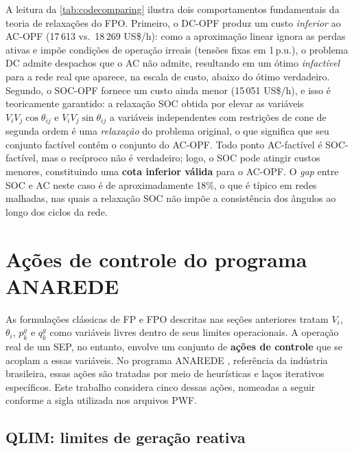 A leitura da \autoref{tab:codecomparing} ilustra dois comportamentos fundamentais da teoria de relaxações do FPO. Primeiro, o DC-OPF produz um custo \emph{inferior} ao AC-OPF (17\,613 vs.\ 18\,269 US\$/h): como a aproximação linear ignora as perdas ativas e impõe condições de operação irreais (tensões fixas em 1\,p.u.), o problema DC admite despachos que o AC não admite, resultando em um ótimo \emph{infactível} para a rede real que aparece, na escala de custo, abaixo do ótimo verdadeiro. Segundo, o SOC-OPF fornece um custo ainda menor (15\,051 US\$/h), e isso é teoricamente garantido: a relaxação SOC obtida por elevar as variáveis $V_i V_j \cos\theta_{ij}$ e $V_i V_j \sin\theta_{ij}$ a variáveis independentes com restrições de cone de segunda ordem é uma \emph{relaxação} do problema original, o que significa que seu conjunto factível contém o conjunto do AC-OPF. Todo ponto AC-factível é SOC-factível, mas o recíproco não é verdadeiro; logo, o SOC pode atingir custos menores, constituindo uma \textbf{cota inferior válida} para o AC-OPF. O \textit{gap} entre SOC e AC neste caso é de aproximadamente 18\%, o que é típico em redes malhadas, nas quais a relaxação SOC não impõe a consistência dos ângulos ao longo dos ciclos da rede.

\section{Ações de controle do programa ANAREDE}
\label{sec:acoes-controle}

As formulações clássicas de FP e FPO descritas nas seções anteriores tratam $V_i$, $\theta_i$, $p^g_k$ e $q^g_k$ como variáveis livres dentro de seus limites operacionais. A operação real de um SEP, no entanto, envolve um conjunto de \textbf{ações de controle} que se acoplam a essas variáveis. No programa ANAREDE \cite{cepel2023anarede}, referência da indústria brasileira, essas ações são tratadas por meio de heurísticas e laços iterativos específicos. Este trabalho considera cinco dessas ações, nomeadas a seguir conforme a sigla utilizada nos arquivos PWF.

\subsection{QLIM: limites de geração reativa}
\label{subsec:qlim}


